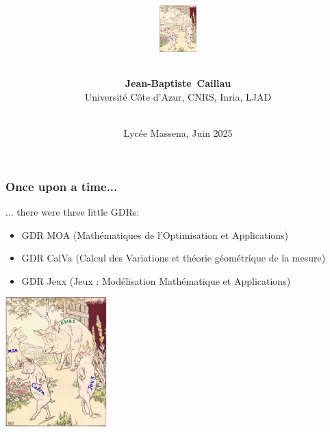 \documentclass[9pt]{beamer}
\title{%
\author{\textbf{Jean-Baptiste~Caillau}\\
Universit\'e C\^ote d'Azur, CNRS, Inria, LJAD}
\includegraphics[height=1.8cm]{3-pigs}}
\date{\textbf{\emphc{De la g\'eom\'etrie \`a la pelle (et r\'eciproquement)}}\\ Lyc\'ee Massena, Juin 2025}
\begin{document}

\begin{frame}
\frametitle{\bf Once upon a time...}
 
... there were three little GDRs:
\begin{itemize}
  \item GDR MOA (Math\'ematiques de l'Optimisation et Applications)
  \item GDR CalVa (Calcul des Variations et th\'eorie g\'eom\'etrique de la mesure)
  \item GDR Jeux (Jeux : Mod\'elisation Math\'ematique et Applications) 
\end{itemize}
 
\centering \includegraphics[height=5.0cm]{3-pigs}

\end{frame}
\end{document}
